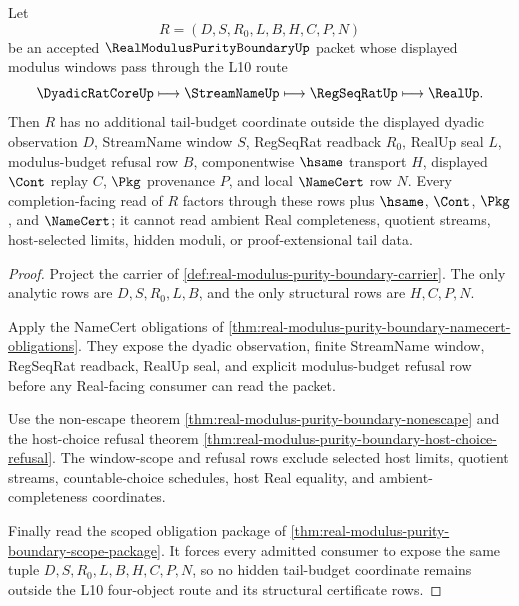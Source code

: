 \begin{theorem}
\label{thm:real-modulus-purity-boundary-tail-budget-exhaustion}
Let
$$
R=(D,S,R_0,L,B,H,C,P,N)
$$
be an accepted $\RealModulusPurityBoundaryUp$ packet whose displayed modulus windows pass through the L10 route
$$
\DyadicRatCoreUp \longmapsto \StreamNameUp \longmapsto \RegSeqRatUp \longmapsto \RealUp .
$$
Then $R$ has no additional tail-budget coordinate outside the displayed dyadic observation $D$, StreamName window $S$, RegSeqRat readback $R_0$, RealUp seal $L$, modulus-budget refusal row $B$, componentwise $\hsame$ transport $H$, displayed $\Cont$ replay $C$, $\Pkg$ provenance $P$, and local $\NameCert$ row $N$. Every completion-facing read of $R$ factors through these rows plus $\hsame$, $\Cont$, $\Pkg$, and $\NameCert$; it cannot read ambient Real completeness, quotient streams, host-selected limits, hidden moduli, or proof-extensional tail data.
\end{theorem}
\begin{proof}
Project the carrier of \autoref{def:real-modulus-purity-boundary-carrier}. The only analytic rows are $D,S,R_0,L,B$, and the only structural rows are $H,C,P,N$.

Apply the NameCert obligations of \autoref{thm:real-modulus-purity-boundary-namecert-obligations}. They expose the dyadic observation, finite StreamName window, RegSeqRat readback, RealUp seal, and explicit modulus-budget refusal row before any Real-facing consumer can read the packet.

Use the non-escape theorem \autoref{thm:real-modulus-purity-boundary-nonescape} and the host-choice refusal theorem \autoref{thm:real-modulus-purity-boundary-host-choice-refusal}. The window-scope and refusal rows exclude selected host limits, quotient streams, countable-choice schedules, host Real equality, and ambient-completeness coordinates.

Finally read the scoped obligation package of \autoref{thm:real-modulus-purity-boundary-scope-package}. It forces every admitted consumer to expose the same tuple $D,S,R_0,L,B,H,C,P,N$, so no hidden tail-budget coordinate remains outside the L10 four-object route and its structural certificate rows.
\end{proof}

